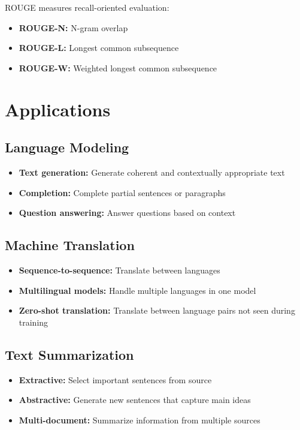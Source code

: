 ROUGE measures recall-oriented evaluation:
\begin{itemize}
    \item \textbf{ROUGE-N:} N-gram overlap
    \item \textbf{ROUGE-L:} Longest common subsequence
    \item \textbf{ROUGE-W:} Weighted longest common subsequence
\end{itemize}

\section{Applications}

\subsection{Language Modeling}

\begin{itemize}
    \item \textbf{Text generation:} Generate coherent and contextually appropriate text
    \item \textbf{Completion:} Complete partial sentences or paragraphs
    \item \textbf{Question answering:} Answer questions based on context
\end{itemize}

\subsection{Machine Translation}

\begin{itemize}
    \item \textbf{Sequence-to-sequence:} Translate between languages
    \item \textbf{Multilingual models:} Handle multiple languages in one model
    \item \textbf{Zero-shot translation:} Translate between language pairs not seen during training
\end{itemize}

\subsection{Text Summarization}

\begin{itemize}
    \item \textbf{Extractive:} Select important sentences from source
    \item \textbf{Abstractive:} Generate new sentences that capture main ideas
    \item \textbf{Multi-document:} Summarize information from multiple sources
\end{itemize}

